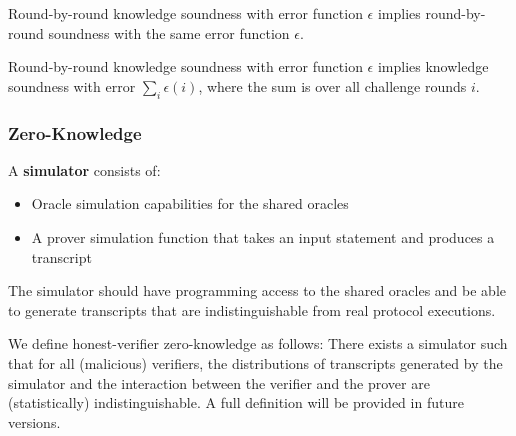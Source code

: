 \begin{theorem}
    \label{thm:rbr_knowledge_soundness_implies_rbr_soundness}
    Round-by-round knowledge soundness with error function $\epsilon$ implies round-by-round
    soundness with the same error function $\epsilon$.
\end{theorem}

\begin{theorem}
    \label{thm:rbr_knowledge_soundness_implies_knowledge_soundness}
    Round-by-round knowledge soundness with error function $\epsilon$ implies knowledge soundness
    with error $\sum_i \epsilon(i)$, where the sum is over all challenge rounds $i$.
\end{theorem}

\subsubsection{Zero-Knowledge}

\begin{definition}[Simulator]
    \label{def:simulator}
    A \textbf{simulator} consists of:
    \begin{itemize}
        \item Oracle simulation capabilities for the shared oracles
        \item A prover simulation function that takes an input statement and produces a transcript
    \end{itemize}
    The simulator should have programming access to the shared oracles and be able to generate
    transcripts that are indistinguishable from real protocol executions.
\end{definition}

\begin{remark}
    We define honest-verifier zero-knowledge as follows: There exists a simulator such that for all
    (malicious) verifiers, the distributions of transcripts generated by the simulator and the
    interaction between the verifier and the prover are (statistically) indistinguishable.
    A full definition will be provided in future versions.
\end{remark}

